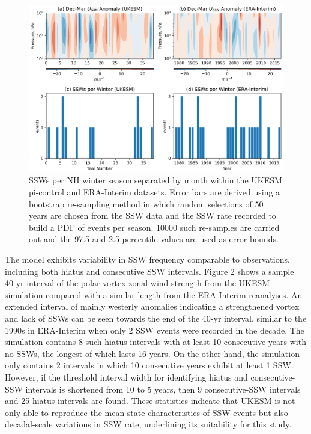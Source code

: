 \begin{figure}[h!]
\begin{center}
\noindent\includegraphics[width = 0.8\linewidth]{Figures/Figures-origins/SSW_series_ERA_UKESM.png}
\caption{SSWs per NH winter season separated by month within the UKESM pi-control and ERA-Interim datasets. Error bars are derived using a bootstrap re-sampling method in which random selections of 50 years are chosen from the SSW data and the SSW rate recorded to build a PDF of events per season. 10000 such re-samples are carried out and the 97.5 and 2.5 percentile values are used as error bounds.}
\label{fig:SSW_histogram}
\end{center}
\end{figure}

The model exhibits variability in SSW frequency comparable to observations, including both hiatus and consecutive SSW intervals. Figure 2 shows a sample 40-yr interval of the polar vortex zonal wind strength from the UKESM simulation compared with a similar length from the ERA Interim reanalyses. An extended interval of mainly westerly anomalies indicating a strengthened vortex and lack of SSWs can be seen towards the end of the 40-yr interval, similar to the 1990s in ERA-Interim when only 2 SSW events were recorded in the decade. The simulation contains 8 such hiatus intervals with at least 10 consecutive years with no SSWs, the longest of which lasts 16 years. On the other hand, the simulation only contains 2 intervals in which 10 consecutive years exhibit at least 1 SSW. However, if the threshold interval width for identifying hiatus and consecutive-SSW intervals is shortened from 10 to 5 years,  then 9 consecutive-SSW intervals and 25 hiatus intervals are found. These statistics indicate that UKESM is not only able to reproduce the mean state characteristics of SSW events but also decadal-scale variations in SSW rate, underlining its  suitability for this study. 

